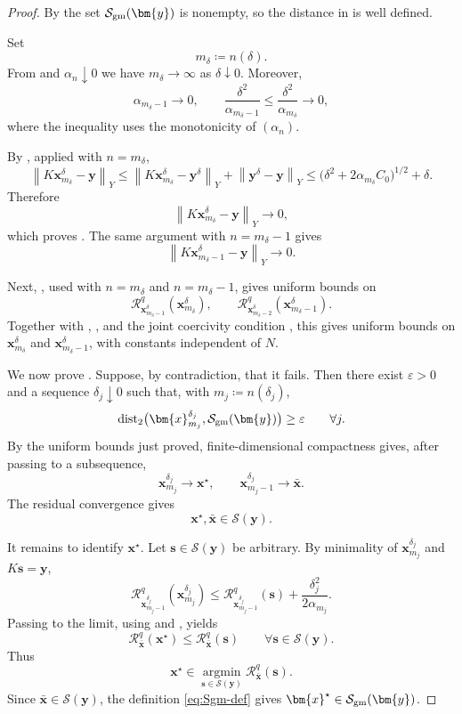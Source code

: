\documentclass{article}
\theoremstyle{remark}
\newcommand{\norm}[1]{\left\lVert #1 \right\rVert}
\newcommand{\Rreg}{\mathcal{R}}
\newcommand{\Ssol}{\mathcal{S}}
\newcommand{\bx}{{\bm{x}}}
\newcommand{\by}{{\bm{y}}}
\newcommand{\bs}{{\bm{s}}}
\begin{document}
\begin{proof}
By  the set $\mathcal S_{\rm gm}(\by)$ is nonempty, so the distance
in  is well defined.

Set
\[
m_\delta\coloneqq n(\delta).
\]
From  and $\alpha_n\downarrow0$ we have
$m_\delta\to\infty$ as $\delta\downarrow0$. Moreover,
\[
\alpha_{m_\delta-1}\to0,
\qquad
\frac{\delta^2}{\alpha_{m_\delta-1}}
\le
\frac{\delta^2}{\alpha_{m_\delta}}
\to0 ,
\]
where the inequality uses the monotonicity of $(\alpha_n)$.

By , applied with $n=m_\delta$,
\[
\norm{K\bx_{m_\delta}^\delta-\by}_Y
\le
\norm{K\bx_{m_\delta}^\delta-\by^\delta}_Y
+\norm{\by^\delta-\by}_Y
\le
\bigl(\delta^2+2\alpha_{m_\delta}C_0\bigr)^{1/2}
+\delta .
\]
Therefore
\[
\norm{K\bx_{m_\delta}^\delta-\by}_Y\to0 ,
\]
which proves . The same argument with
$n=m_\delta-1$ gives
\begin{equation}\label{eq:predecessor-residual-convergence}
\norm{K\bx_{m_\delta-1}^\delta-\by}_Y\to0 .
\end{equation}

Next, , used with $n=m_\delta$ and $n=m_\delta-1$,
gives uniform bounds on
\[
\Rreg_{\bx_{m_\delta-1}^\delta}^q(\bx_{m_\delta}^\delta),
\qquad
\Rreg_{\bx_{m_\delta-2}^\delta}^q(\bx_{m_\delta-1}^\delta).
\]
Together with ,
, and the joint coercivity condition
, this gives uniform bounds on
$\bx_{m_\delta}^\delta$ and $\bx_{m_\delta-1}^\delta$, with constants
independent of $N$.

We now prove . Suppose, by contradiction, that it
fails. Then there exist $\varepsilon>0$ and a sequence $\delta_j\downarrow0$
such that, with $m_j\coloneqq n(\delta_j)$,
\begin{equation}\label{eq:dist-contradiction}
\operatorname{dist}_2
\bigl(\bx_{m_j}^{\delta_j},\mathcal S_{\rm gm}(\by)\bigr)
\ge\varepsilon
\qquad\forall j .
\end{equation}
By the uniform bounds just proved, finite-dimensional compactness gives, after
passing to a subsequence,
\[
\bx_{m_j}^{\delta_j}\to\bx^\star,
\qquad
\bx_{m_j-1}^{\delta_j}\to\bar\bx .
\]
The residual convergence gives
\[
\bx^\star,\bar\bx\in\Ssol(\by).
\]

It remains to identify $\bx^\star$. Let $\bs\in\Ssol(\by)$ be arbitrary. By
minimality of $\bx_{m_j}^{\delta_j}$ and $K\bs=\by$,
\[
\Rreg_{\bx_{m_j-1}^{\delta_j}}^q(\bx_{m_j}^{\delta_j})
\le
\Rreg_{\bx_{m_j-1}^{\delta_j}}^q(\bs)
+\frac{\delta_j^2}{2\alpha_{m_j}} .
\]
Passing to the limit, using  and
, yields
\[
\Rreg_{\bar\bx}^q(\bx^\star)
\le
\Rreg_{\bar\bx}^q(\bs)
\qquad
\forall \bs\in\Ssol(\by).
\]
Thus
\[
\bx^\star\in
\operatorname*{argmin}_{\bs\in\Ssol(\by)}
\Rreg_{\bar\bx}^q(\bs).
\]
Since $\bar\bx\in\Ssol(\by)$, the definition \cref{eq:Sgm-def} gives
$\bx^\star\in\mathcal S_{\rm gm}(\by)$.


\end{proof}
\end{document}
